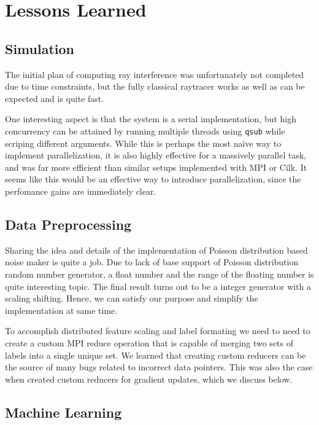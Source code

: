 \section{Lessons Learned}
\label{lessons}

\subsection{Simulation}

The initial plan of computing ray interference was unfortunately not completed due to time constraints, but the fully classical raytracer works as well as can be expected and is quite fast.

One interesting aspect is that the system is a serial implementation, but high concurrency can be attained by running multiple threads using \verb|qsub| while scriping different arguments. While this is perhaps the most na\"ive way to implement parallelization, it is also highly effective for a massively parallel task, and was far more efficient than similar setups implemented with MPI or Cilk. It seems like this would be an effective way to introduce parallelization, since the perfomance gains are immediately clear.


\subsection{Data Preprocessing}

Sharing the idea and details of the implementation of Poisson distribution based noise maker is quite a job. Due to lack of base support of Poisson distribution random number generator, a float number and the range of the floating number is quite interesting topic. The final result turns out to be a integer generator with a scaling shifting. Hence, we can satisfy our purpose and simplify the implementation at same time.

To accomplish distributed feature scaling and label formating we need to need to create a custom MPI reduce operation that is capable of merging two sets of labels into a single unique set.  We learned that creating custom reducers can be the source of many bugs related to incorrect data pointers.  This was also the case when created custom reducers for gradient updates, which we discuss below.

\subsection{Machine Learning}

